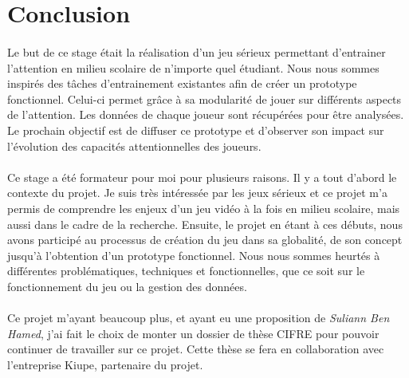 \section*{Conclusion}

\paragraph{}Le but de ce stage était la réalisation d'un jeu sérieux permettant d'entrainer l'attention en milieu scolaire de n'importe quel étudiant. Nous nous sommes inspirés des
tâches d'entrainement existantes afin de créer un prototype fonctionnel. Celui-ci permet grâce à sa modularité de jouer sur différents aspects de l'attention. Les données de chaque
joueur sont récupérées pour être analysées. Le prochain objectif est de diffuser ce prototype et d'observer son impact sur l'évolution des capacités attentionnelles des joueurs.

\paragraph{}Ce stage a été formateur pour moi pour plusieurs raisons. Il y a tout d'abord le contexte du projet. Je suis très intéressée par les jeux sérieux et ce projet m'a permis de
comprendre les enjeux d'un jeu vidéo à la fois en milieu scolaire, mais aussi dans le cadre de la recherche. Ensuite, le projet en étant à ces débuts, nous avons participé au processus
de création du jeu dans sa globalité, de son concept jusqu'à l'obtention d'un prototype fonctionnel. Nous nous sommes heurtés à différentes problématiques, techniques et fonctionnelles,
que ce soit sur le fonctionnement du jeu ou la gestion des données.

\paragraph{}Ce projet m'ayant beaucoup plus, et ayant eu une proposition de \emph{Suliann Ben Hamed}, j'ai fait le choix de monter un dossier de thèse CIFRE pour pouvoir continuer de
travailler sur ce projet. Cette thèse se fera en collaboration avec l'entreprise Kiupe, partenaire du projet.

\newpage